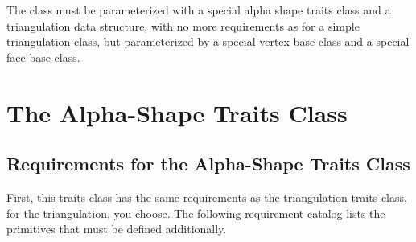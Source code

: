 The class  must be parameterized with a special alpha shape
traits class and a triangulation data structure, with no more requirements as
for a simple triangulation class, but parameterized by a special vertex base
class and a special face base class.

\section*{The Alpha-Shape Traits Class\label{I1_ASTraits}} 

\subsection{Requirements for the Alpha-Shape Traits Class}

First, this traits class has the same requirements as the 
triangulation traits class, for the  triangulation, you choose.
The following requirement catalog lists the primitives that must be defined
additionally.


